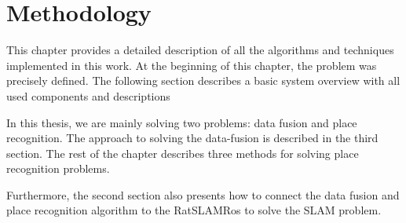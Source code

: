 \chapter{Methodology}\label{chapter:methodology}

This chapter provides a detailed description of all the algorithms and techniques implemented in this work. At the beginning of this chapter, the problem was precisely defined. The following section describes a basic system overview with all used components and descriptions\par
In this thesis, we are mainly solving two problems: data fusion and place recognition. The approach to solving the data-fusion is described in the third section. The rest of the chapter describes three methods for solving place recognition problems.\par
Furthermore, the second section also presents how to connect the data fusion and place recognition algorithm to the RatSLAMRos to solve the SLAM problem.







